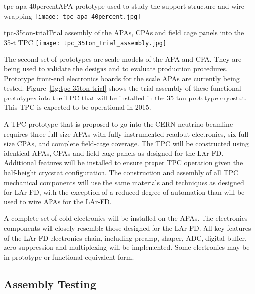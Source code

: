 \begin{cdrfigure}{tpc-apa-40percent}{APA prototype used to study the support structure and wire wrapping}
\texttt{[image: tpc\_apa\_40percent.jpg]}
\end{cdrfigure}

\begin{cdrfigure}{tpc-35ton-trial}{Trial assembly of the APAs, CPAs and field cage panels into the 35-t TPC}
\texttt{[image: tpc\_35ton\_trial\_assembly.jpg]}
\end{cdrfigure}

The second set of prototypes are scale models of the APA and CPA. They are being used to validate the designs and to evaluate production procedures. Prototype front-end electronics boards for the scale APAs are currently being tested. Figure~\ref{fig:tpc-35ton-trial} shows the trial assembly of these functional prototypes into the TPC that will be installed in the 35 ton prototype cryostat. This TPC is expected to be operational in 2015.

A TPC prototype that is proposed to go into the CERN neutrino beamline requires three full-size APAs with fully instrumented readout electronics, six full-size CPAs, and complete field-cage coverage. The TPC will be constructed using identical APAs, CPAs and field-cage panels as designed for the LAr-FD. Additional features will be installed to ensure proper TPC operation given the half-height cryostat configuration. The construction and assembly of all TPC mechanical components will use the same materials and techniques as designed for LAr-FD, with the exception of a reduced degree of automation than will be used to wire APAs for the LAr-FD. 

A complete set of cold electronics will be installed on the APAs. The electronics components will closely resemble those designed for the LAr-FD. All key features of the LAr-FD electronics chain, including preamp, shaper, ADC, digital buffer, zero suppression and multiplexing will be implemented. Some electronics may be in prototype or functional-equivalent form.


\subsection{Assembly Testing}
\label{sec:v5-tpc-checkout-test}

